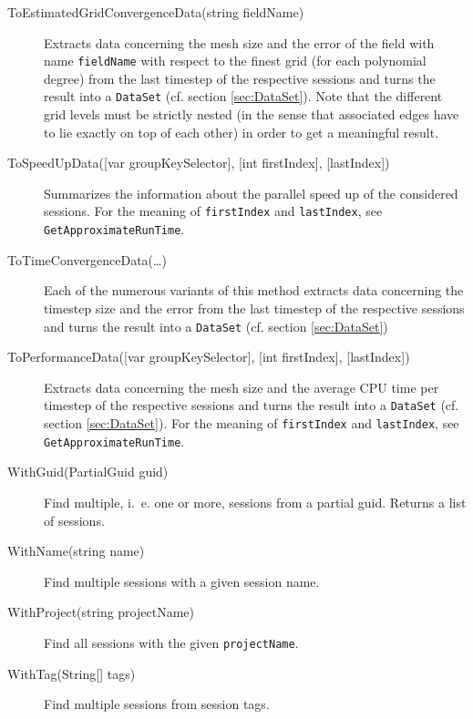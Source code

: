 \begin{description}
	\item[ToEstimatedGridConvergenceData(string fieldName)]
	Extracts data concerning the mesh size and the error of the field with name \lstinline{fieldName} with respect to the finest grid (for each polynomial degree) from the last timestep of the respective sessions and turns the result into a \lstinline{DataSet} (cf. section \ref{sec:DataSet}). Note that the different grid levels must be strictly nested (in the sense that associated edges have to lie exactly on top of each other) in order to get a meaningful result.
	
	\item[ToSpeedUpData({[}var groupKeySelector{]}, {[}int firstIndex{]}, {[}lastIndex{]})]
	Summarizes the information about the parallel speed up of the considered sessions. For the meaning of \lstinline{firstIndex} and \lstinline{lastIndex}, see \lstinline{GetApproximateRunTime}.
	
	\item[ToTimeConvergenceData(\ldots)]
	Each of the numerous variants of this method extracts data concerning the timestep size and the error from the last timestep of the respective sessions and turns the result into a \lstinline{DataSet} (cf. section \ref{sec:DataSet})
	
	\item[ToPerformanceData({[}var groupKeySelector{]}, {[}int firstIndex{]}, {[}lastIndex{]})]
	Extracts data concerning the mesh size and the average CPU time per timestep of the respective sessions and turns the result into a \lstinline{DataSet} (cf. section \ref{sec:DataSet}). For the meaning of \lstinline{firstIndex} and \lstinline{lastIndex}, see \lstinline{GetApproximateRunTime}.
	
	\item[WithGuid(PartialGuid guid)]
	Find multiple, i.~e. one or more, sessions from a partial guid. Returns a list of sessions.

	\item[WithName(string name)]
	Find multiple sessions with a given session name.
	
	\item[WithProject(string projectName)]
	Find all sessions with the given \lstinline{projectName}.
	
	\item[WithTag(String{[}{]} tags)]
	Find multiple sessions from session tags.
\end{description}

